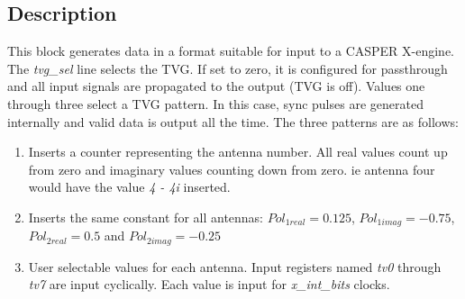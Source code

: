 \documentclass{article}
\newcommand{\BlockDesc}[1]{\subsection*{Description}#1}
\begin{document}
\BlockDesc{
This block generates data in a format suitable for input to a CASPER X-engine. The \textit{tvg\_sel} line selects the TVG. If set to zero, it is configured for passthrough and all input signals are propagated to the output (TVG is off). Values one through three select a TVG pattern. In this case, sync pulses are generated internally and valid data is output all the time. The three patterns are as follows:

\begin{enumerate}
\item Inserts a counter representing the antenna number. All real values count up from zero and imaginary values counting down from zero. ie antenna four would have the value \textit{4 - 4i} inserted.
\item Inserts the same constant for all antennas: $Pol_{1real}=0.125$, $Pol_{1imag}=-0.75$, $Pol_{2real}=0.5$ and $Pol_{2imag}=-0.25$
\item User selectable values for each antenna. Input registers named \textit{tv0} through \textit{tv7} are input cyclically. Each value is input for \textit{x\_int\_bits} clocks.
\end{enumerate}

} 
\end{document}
